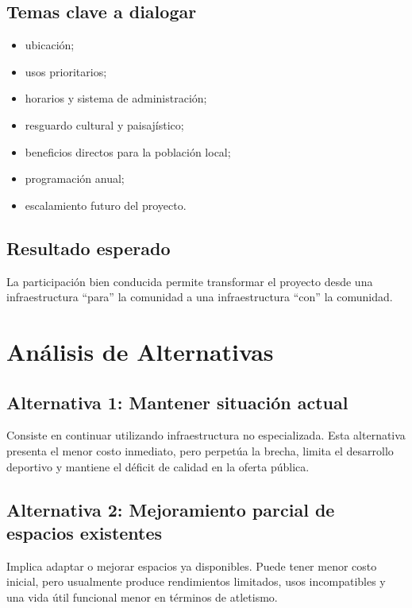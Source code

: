 \documentclass[12pt,letterpaper]{article}
\begin{document}
\subsection{Temas clave a dialogar}

\begin{itemize}
    \item ubicación;
    \item usos prioritarios;
    \item horarios y sistema de administración;
    \item resguardo cultural y paisajístico;
    \item beneficios directos para la población local;
    \item programación anual;
    \item escalamiento futuro del proyecto.
\end{itemize}

\subsection{Resultado esperado}

La participación bien conducida permite transformar el proyecto desde una infraestructura “para” la comunidad a una infraestructura “con” la comunidad.

\section{Análisis de Alternativas}

\subsection{Alternativa 1: Mantener situación actual}

Consiste en continuar utilizando infraestructura no especializada. Esta alternativa presenta el menor costo inmediato, pero perpetúa la brecha, limita el desarrollo deportivo y mantiene el déficit de calidad en la oferta pública.

\subsection{Alternativa 2: Mejoramiento parcial de espacios existentes}

Implica adaptar o mejorar espacios ya disponibles. Puede tener menor costo inicial, pero usualmente produce rendimientos limitados, usos incompatibles y una vida útil funcional menor en términos de atletismo.
\end{document}
